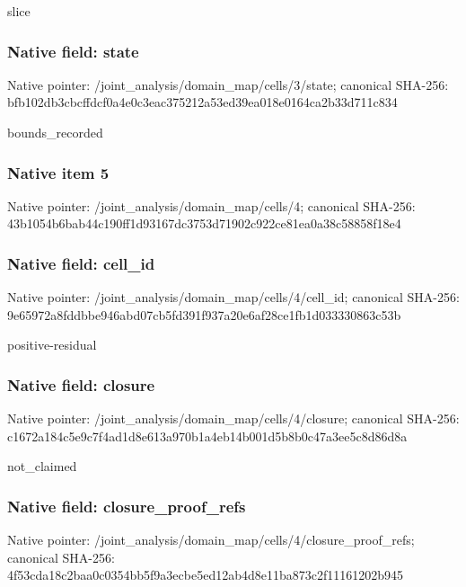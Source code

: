 \documentclass[10pt,a4paper]{article}
\begin{document}
\begingroup\raggedright\sloppy slice\par\endgroup

\subsubsection{Native field: state}
Native pointer: /joint\_\allowbreak{}analysis/domain\_\allowbreak{}map/cells/3/state; canonical SHA-256: bfb102db3cbcffdcf0a4e0c3eac375212a53ed39ea018e0164ca2b33d711c834

\begingroup\raggedright\sloppy bounds\_\allowbreak{}recorded\par\endgroup

\subsubsection{Native item 5}
Native pointer: /joint\_\allowbreak{}analysis/domain\_\allowbreak{}map/cells/4; canonical SHA-256: 43b1054b6bab44c190ff1d93167dc3753d71902c922ce81ea0a38c58858f18e4

\subsubsection{Native field: cell\_\allowbreak{}id}
Native pointer: /joint\_\allowbreak{}analysis/domain\_\allowbreak{}map/cells/4/cell\_\allowbreak{}id; canonical SHA-256: 9e65972a8fddbbe946abd07cb5fd391f937a20e6af28ce1fb1d033330863c53b

\begingroup\raggedright\sloppy positive-residual\par\endgroup

\subsubsection{Native field: closure}
Native pointer: /joint\_\allowbreak{}analysis/domain\_\allowbreak{}map/cells/4/closure; canonical SHA-256: c1672a184c5e9c7f4ad1d8e613a970b1a4eb14b001d5b8b0c47a3ee5c8d86d8a

\begingroup\raggedright\sloppy not\_\allowbreak{}claimed\par\endgroup

\subsubsection{Native field: closure\_\allowbreak{}proof\_\allowbreak{}refs}
Native pointer: /joint\_\allowbreak{}analysis/domain\_\allowbreak{}map/cells/4/closure\_\allowbreak{}proof\_\allowbreak{}refs; canonical SHA-256: 4f53cda18c2baa0c0354bb5f9a3ecbe5ed12ab4d8e11ba873c2f11161202b945
\end{document}
